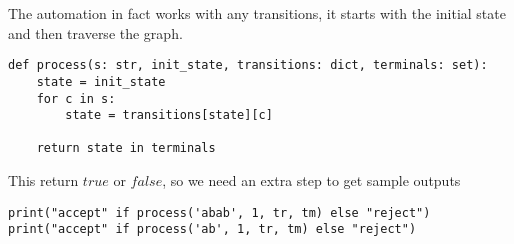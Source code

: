 \documentclass[12pt]{simple_doc}
\begin{document}
    The automation in fact works with any transitions, it starts with the initial state
    and then traverse the graph.
    \begin{verbatim}
def process(s: str, init_state, transitions: dict, terminals: set):
    state = init_state
    for c in s:
        state = transitions[state][c]

    return state in terminals
    \end{verbatim}

    This return $true$ or $false$, so we need an extra step to get sample outputs
    \begin{verbatim}
print("accept" if process('abab', 1, tr, tm) else "reject")
print("accept" if process('ab', 1, tr, tm) else "reject")
    \end{verbatim}
\end{document}
